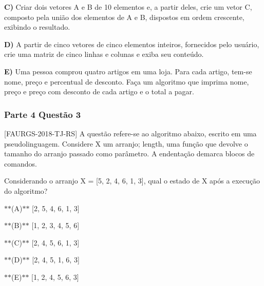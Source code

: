 \begin{DoxyItemize}
\item {\bfseries{C)}} Criar dois vetores A e B de 10 elementos e, a partir deles, crie um vetor C, composto pela união dos elementos de A e B, dispostos em ordem crescente, exibindo o resultado.
\item {\bfseries{D)}} A partir de cinco vetores de cinco elementos inteiros, fornecidos pelo usuário, crie uma matriz de cinco linhas e colunas e exiba seu conteúdo.
\item {\bfseries{E)}} Uma pessoa comprou quatro artigos em uma loja. Para cada artigo, tem-\/se nome, preço e percentual de desconto. Faça um algoritmo que imprima nome, preço e preço com desconto de cada artigo e o total a pagar.
\end{DoxyItemize}

\subsubsection*{Parte 4 Questão 3}

[F\+A\+U\+R\+G\+S-\/2018-\/\+T\+J-\/\+RS] A questão refere-\/se ao algoritmo abaixo, escrito em uma pseudolinguagem. Considere X um arranjo; length, uma função que devolve o tamanho do arranjo passado como parâmetro. A endentação demarca blocos de comandos.


\begin{DoxyCode}{0}
\DoxyCodeLine{}
\DoxyCodeLine{}
\DoxyCodeLine{}
\DoxyCodeLine{}
\DoxyCodeLine{}
\DoxyCodeLine{}
\end{DoxyCode}


Considerando o arranjo {\ttfamily X = [5, 2, 4, 6, 1, 3]}, qual o estado de X após a execução do algoritmo?


\begin{DoxyItemize}
\item $\ast$$\ast$(A)$\ast$$\ast$ [2, 5, 4, 6, 1, 3]
\item $\ast$$\ast$(B)$\ast$$\ast$ [1, 2, 3, 4, 5, 6]
\item $\ast$$\ast$(C)$\ast$$\ast$ [2, 4, 5, 6, 1, 3]
\item $\ast$$\ast$(D)$\ast$$\ast$ [2, 4, 5, 1, 6, 3]
\item $\ast$$\ast$(E)$\ast$$\ast$ [1, 2, 4, 5, 6, 3]
\end{DoxyItemize}

